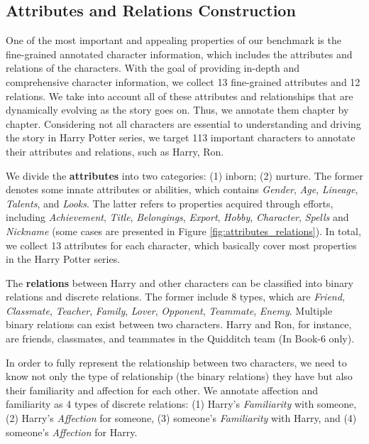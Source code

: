 \documentclass[11pt]{article}
\begin{document}
\subsection{Attributes and Relations Construction}
\label{personas}
One of the most important and appealing properties of our benchmark is the fine-grained annotated character information, which includes the attributes and relations of the characters. With the goal of providing in-depth and comprehensive character information, we collect 13 fine-grained attributes and 12 relations. We take into account all of these attributes and relationships that are dynamically evolving as the story goes on. Thus, we annotate them chapter by chapter. Considering not all characters are essential to understanding and driving the story in Harry Potter series, we target 113 important characters to annotate their attributes and relations, such as Harry, Ron.



We divide the \textbf{attributes} into two categories: (1) inborn; (2) nurture. The former denotes some innate attributes or abilities, which contains \textit{Gender}, \textit{Age}, \textit{Lineage}, \textit{Talents}, and \textit{Looks}. The latter refers to properties acquired through efforts, including  \textit{Achievement}, \textit{Title}, \textit{Belongings}, \textit{Export},  \textit{Hobby}, \textit{Character}, \textit{Spells} and \textit{Nickname} (some cases are presented in Figure \ref{fig:attributes_relations}). In total, we collect 13 attributes for each character, which basically cover most properties in the Harry Potter series. 




The \textbf{relations} between Harry and other characters can be classified into binary relations and discrete relations. The former include 8 types, which are \textit{Friend}, \textit{Classmate}, \textit{Teacher}, \textit{Family}, \textit{Lover}, \textit{Opponent},  \textit{Teammate}, \textit{Enemy}. Multiple binary relations can exist between two characters. Harry and Ron, for instance, are friends, classmates, and teammates in the Quidditch team (In Book-6 only). 

In order to fully represent the relationship between two characters, we need to know not only the type of relationship (the binary relations) they have but also their familiarity and affection for each other. We annotate affection and familiarity as 4 types of discrete relations: (1) Harry's \textit{Familiarity} with someone, (2) Harry's \textit{Affection} for someone, (3) someone's \textit{Familiarity} with Harry, and (4) someone's \textit{Affection} for Harry. 
\end{document}
